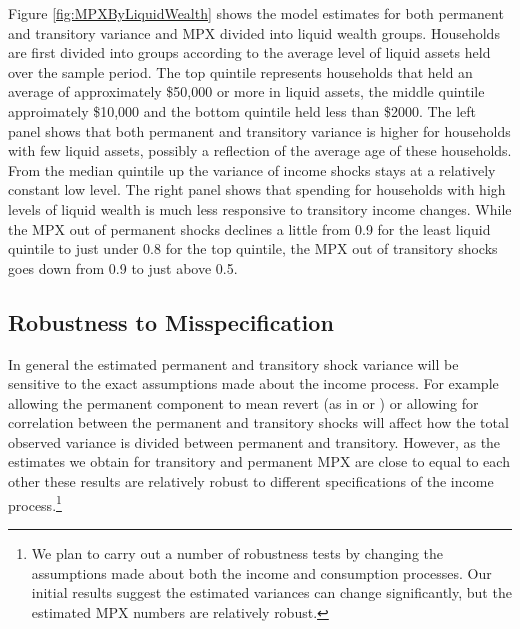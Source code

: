 \documentclass[titlepage]{\econtex}\newcommand{\texname}{IncomeUncertainty}
\begin{document}
Figure \ref{fig:MPXByLiquidWealth} shows the model estimates for both permanent and transitory variance and MPX divided into liquid wealth groups. Households are first divided into groups according to the average level of liquid assets held over the sample period. The top quintile represents households that held an average of approximately \$50,000 or more in liquid assets, the middle quintile approimately \$10,000 and the bottom quintile held less than \$2000. The left panel shows that both permanent and transitory variance is higher for households with few liquid assets, possibly a reflection of the average age of these households. From the median quintile up the variance of income shocks stays at a relatively constant low level. The right panel shows that spending for households with high levels of liquid wealth is much less responsive to transitory income changes. While the MPX out of permanent shocks declines a little from 0.9 for the least liquid quintile to just under 0.8 for the top quintile, the MPX out of transitory shocks goes down from 0.9 to just above 0.5.

\subsection{Robustness to Misspecification} \label{misspecification}
In general the estimated permanent and transitory shock variance will be sensitive to the exact assumptions made about the income process. For example allowing the permanent component to mean revert (as in \cite{ahn_when_2017} or \cite{arellano_earnings_2017}) or allowing for correlation between the permanent and transitory shocks will affect how the total observed variance is divided between permanent and transitory. However, as the estimates we obtain for transitory and permanent MPX are close to equal to each other these results are relatively robust to different specifications of the income process.\footnote{We plan to carry out a number of robustness tests by changing the assumptions made about both the income and consumption processes. Our initial results suggest the estimated variances can change significantly, but the estimated MPX numbers are relatively robust.}
\end{document}
